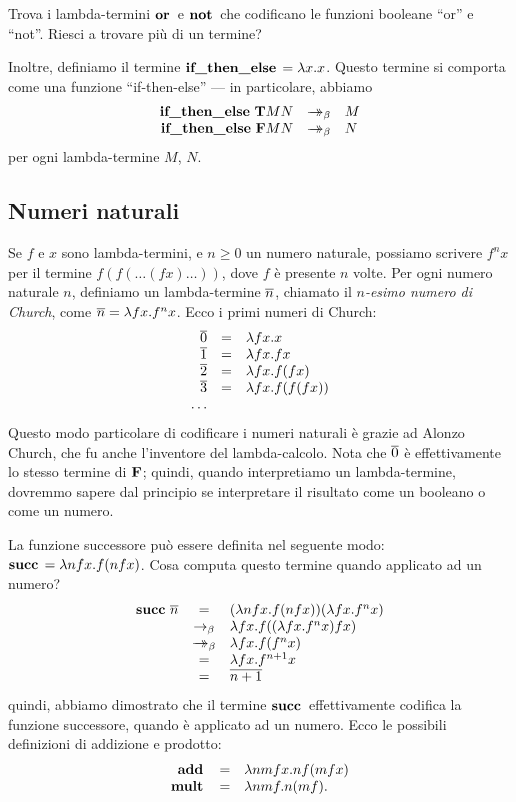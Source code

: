 \documentclass{article}
\begin{document}
\begin{exercise}
  Trova i lambda-termini $\mathop{\textbf{\bf or}\,}$ e $\mathop{\textbf{\bf not}\,}$ che codificano le funzioni
  booleane ``or'' e ``not''. Riesci a trovare pi\`u di un termine?
\end{exercise}

Inoltre, definiamo il termine $\mathop{\textbf{\bf if\_then\_else}\,}=\lambda x.x$. Questo termine si 
comporta come una funzione ``if-then-else'' --- in particolare, abbiamo
\[ \begin{array}{rcl}
  \ifthenelset \truet M N &\redbs& M \\
  \ifthenelset \falset M N &\redbs& N \\
\end{array}
\]
per ogni lambda-termine $M$, $N$.

\subsection{Numeri naturali}\label{ssec-natural-numbers}

Se $f$ e $x$ sono lambda-termini, e $n\geq 0$ un numero naturale, possiamo scrivere
$f^nx$ per il termine $f(f(\ldots(fx)\ldots))$, dove $f$ \`e presente $n$
volte.  Per ogni numero naturale $n$, definiamo un lambda-termine
$\mathop{\overline{n}}$, chiamato il {\em $n$-esimo numero di Church}, come $\mathop{\overline{n}}=\lambda
fx.f^nx$. Ecco i primi numeri di Church:
\[ \begin{array}{rcl}
  \mathop{\overline{0}} &=& \lambda fx.x \\
  \mathop{\overline{1}} &=& \lambda fx.fx \\
  \mathop{\overline{2}} &=& \lambda fx.f(fx) \\
  \mathop{\overline{3}} &=& \lambda fx.f(f(fx)) \\
  \ldots
\end{array}
\]
Questo modo particolare di codificare i numeri naturali \`e grazie ad Alonzo
Church, che fu anche l'inventore del lambda-calcolo.
Nota che $\mathop{\overline{0}}$ \`e effettivamente lo stesso termine di ${\bf F}$; 
quindi, quando interpretiamo un lambda-termine, dovremmo sapere dal principio 
se interpretare il risultato come un booleano o come un numero.

La funzione successore pu\`o essere definita nel seguente modo: $\mathop{\textbf{\bf succ}\,} = \lambda
nfx.f(nfx)$. Cosa computa questo termine quando applicato ad un numero?
\[ \begin{array}{rcl}
  \mathop{\textbf{\bf succ}\,} \mathop{\overline{n}} &=& (\lambda nfx.f(nfx))(\lambda fx.f^nx) \\
  &\rightarrow_{\beta}& \lambda fx.f((\lambda fx.f^nx)fx) \\
  &\mathrel{\rightarrow\!\!\!\!\!\rightarrow}_{\beta}& \lambda fx.f(f^nx) \\
  &=& \lambda fx.f^{n+1}x \\
  &=& \mathop{\overline{n+1}}
\end{array}
\]
quindi, abbiamo dimostrato che il termine $\mathop{\textbf{\bf succ}\,}$ effettivamente codifica
la funzione successore, quando \`e applicato ad un numero. Ecco le possibili
definizioni di addizione e prodotto:
\[ \begin{array}{rcl}
  \mathop{\textbf{\bf add}\,} &=& \lambda nmfx.nf(mfx) \\
  \mathop{\textbf{\bf mult}\,} &=& \lambda nmf.n(mf). 
\end{array}
\]
\end{document}
